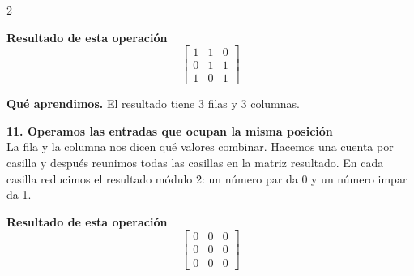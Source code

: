 \documentclass[11pt,a4paper,landscape]{article}
\begin{document}
\begin{multicols*}{2}
\begin{minipage}{\linewidth}
\par\smallskip \textbf{Resultado de esta operación}\[\begin{bmatrix}1 & 1 & 0\\0 & 1 & 1\\1 & 0 & 1\end{bmatrix}\]
\par\smallskip\textbf{Qué aprendimos.} El resultado tiene 3 filas y 3 columnas.
\end{minipage}\par\medskip
\noindent\begin{minipage}{\linewidth}\textbf{11. Operamos las entradas que ocupan la misma posición}\\[2pt]La fila y la columna nos dicen qué valores combinar. Hacemos una cuenta por casilla y después reunimos todas las casillas en la matriz resultado. En cada casilla reducimos el resultado módulo 2: un número par da 0 y un número impar da 1.
\par{}\par\smallskip
\par\smallskip \textbf{Resultado de esta operación}\[\begin{bmatrix}0 & 0 & 0\\0 & 0 & 0\\0 & 0 & 0\end{bmatrix}\]

\end{minipage}
\end{multicols*}
\end{document}
